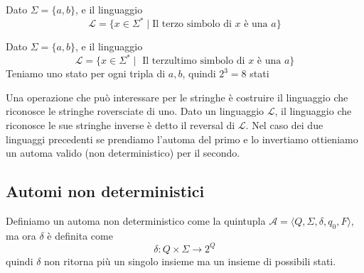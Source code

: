 \documentclass[12pt]{article}
\begin{document}
\begin{tcolorbox}
	Dato $\Sigma = \{ a, b \}$, e il linguaggio 
	$$ \mathscr{L} = \{ x \in \Sigma^* \mid \text{Il terzo simbolo di $x$ è una $a$}\}$$
	\begin{center}
	\end{center}
\end{tcolorbox}
\begin{tcolorbox}
	Dato $\Sigma = \{ a, b \}$, e il linguaggio 
	$$ \mathscr{L} = \{ x \in \Sigma^* \mid \text{ Il terzultimo simbolo di $x$ è una $a$} \} $$
	Teniamo uno stato per ogni tripla di $a, b$, quindi $2^3 = 8$ stati
\end{tcolorbox}

Una operazione che può interessare per le stringhe è costruire il linguaggio che riconosce le stringhe roversciate di uno.
Dato un linguaggio $\mathscr{L}$, il linguaggio che riconosce le sue stringhe inverse è detto il reversal di $\mathscr{L}$.
Nel caso dei due linguaggi precedenti se prendiamo l'automa del primo e lo invertiamo ottieniamo un automa valido (non deterministico) per il secondo.

\subsection{Automi non deterministici}
Definiamo un automa non deterministico come la quintupla $\mathscr{A} = \langle Q, \Sigma, \delta, q_0, F \rangle$, ma ora $\delta$ è definita come
$$ \delta : Q \times \Sigma \rightarrow 2^Q $$
quindi $\delta$ non ritorna più un singolo insieme ma un insieme di possibili stati.
\end{document}
